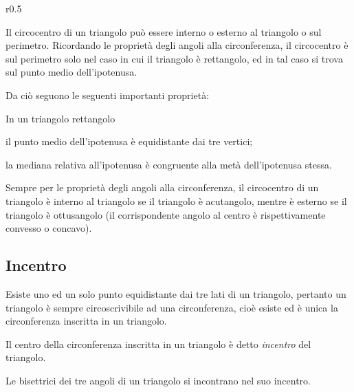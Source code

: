 \begin{wrapfigure}{r}{0.5\textwidth}
	\centering
\end{wrapfigure}
\osservazione Il circocentro di un triangolo può essere interno o esterno al triangolo o sul perimetro. Ricordando le proprietà degli angoli alla circonferenza, il circocentro è sul perimetro solo nel caso in cui il triangolo è rettangolo, ed in tal caso si trova sul punto medio dell'ipotenusa.

Da ciò seguono le seguenti importanti proprietà:
\begin{teorema}
In un triangolo rettangolo
\begin{itemize*}
\item il punto medio dell'ipotenusa è equidistante dai tre vertici;
\item la mediana relativa all'ipotenusa è congruente alla metà dell'ipotenusa stessa.
\end{itemize*}
\end{teorema}

Sempre per le proprietà degli angoli alla circonferenza, il circocentro di un triangolo è interno al triangolo se il triangolo è acutangolo, mentre è esterno se il triangolo è ottusangolo (il corrispondente angolo al centro è rispettivamente convesso o concavo).

\subsection{Incentro}

Esiste uno ed un solo punto equidistante dai tre lati di un triangolo, pertanto un triangolo è sempre circoscrivibile ad una circonferenza, cioè esiste ed è unica la circonferenza inscritta in un triangolo.

\begin{definizione}
Il centro della circonferenza inscritta in un triangolo è detto \emph{incentro} del triangolo.
\end{definizione}

\begin{teorema}
Le bisettrici dei tre angoli di un triangolo si incontrano nel suo incentro.
\end{teorema}

